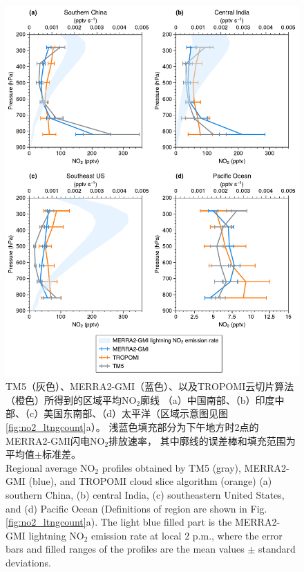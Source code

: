 \begin{figure}[!htbp]
    \centering
    \includegraphics[width=12cm]{./figures/utno2_profile.pdf}
    \caption{
    TM5（灰色）、MERRA2-GMI（蓝色）、以及TROPOMI云切片算法（橙色）所得到的区域平均NO$_2$廓线
    （a）中国南部、（b）印度中部、（c）美国东南部、（d）太平洋（区域示意图见图\ref{fig:no2_ltngcount}a）。
    浅蓝色填充部分为下午地方时2点的MERRA2-GMI闪电NO$_2$排放速率，
    其中廓线的误差棒和填充范围为平均值$\pm$标准差。\\
    Regional average NO$_2$ profiles obtained by TM5 (gray), MERRA2-GMI (blue), and TROPOMI cloud slice algorithm (orange)
    (a) southern China, (b) central India, (c) southeastern United States, and (d) Pacific Ocean
    (Definitions of region are shown in Fig. \ref{fig:no2_ltngcount}a).
    The light blue filled part is the MERRA2-GMI lightning NO$_2$ emission rate at local 2 p.m.,
    where the error bars and filled ranges of the profiles are the mean values $\pm$ standard deviations.
    }
    \label{fig:utno2_profile}
\end{figure}
\FloatBarrier


